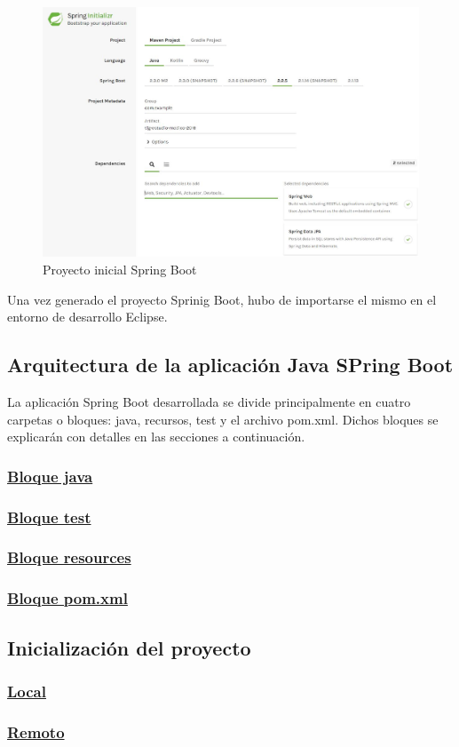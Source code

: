     \begin{figure}[h]
    \centering
     \includegraphics[width=1\textwidth]{images/springstarter}
    \caption{Proyecto inicial Spring Boot}
    \end{figure}
    
    Una vez generado el proyecto Sprinig Boot, hubo de importarse el mismo en el entorno de desarrollo Eclipse.
    
    
    \subsection{Arquitectura de la aplicación Java SPring Boot}
    La aplicación Spring Boot desarrollada se divide principalmente en cuatro carpetas o bloques: java, recursos, test  y el archivo pom.xml. Dichos bloques se explicarán con detalles en las secciones a continuación.

        \subsubsection{\underline{Bloque java}}
        \subsubsection{\underline{Bloque test}}
        \subsubsection{\underline{Bloque resources}}
        \subsubsection{\underline{Bloque pom.xml}}
        
        
    \subsection{Inicialización del proyecto}
        \subsubsection{\underline{Local}}
        \subsubsection{\underline{Remoto}}
    